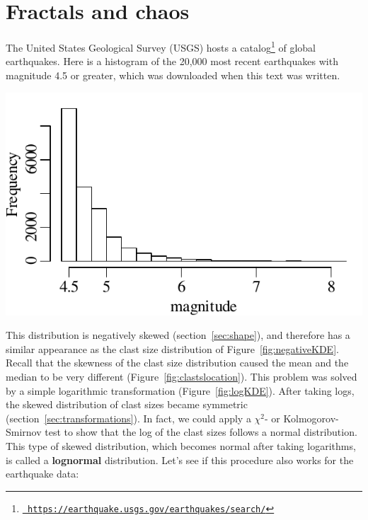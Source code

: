 \chapter{Fractals and chaos}
\label{ch:fractals}

The United States Geological Survey (USGS) hosts a
catalog\footnote{\href{https://earthquake.usgs.gov/earthquakes/search/}{\tt
    https://earthquake.usgs.gov/earthquakes/search/}} of global
earthquakes. Here is a histogram of the 20,000 most recent earthquakes
with magnitude 4.5 or greater, which was downloaded when this text was
written.

\noindent\begin{minipage}[t][][b]{.4\textwidth}
  \includegraphics[width=\textwidth]{../figures/recentquakes.pdf}\\
\end{minipage}
\begin{minipage}[t][][t]{.6\textwidth}
  \label{fig:recentquakes}
\end{minipage}

This distribution is negatively skewed (section~\ref{sec:shape}), and
therefore has a similar appearance as the clast size distribution of
Figure~\ref{fig:negativeKDE}. Recall that the skewness of the clast
size distribution caused the mean and the median to be very different
(Figure~\ref{fig:clastslocation}). This problem was solved by a simple
logarithmic transformation (Figure~\ref{fig:logKDE}). After taking
logs, the skewed distribution of clast sizes became symmetric
(section~\ref{sec:transformations}).  In fact, we could apply a
$\chi^2$- or Kolmogorov-Smirnov test to show that the log of the clast
sizes follows a normal distribution.  This type of skewed
distribution, which becomes normal after taking logarithms, is called
a \textbf{lognormal} distribution. Let's see if this procedure also
works for the earthquake data:\\

